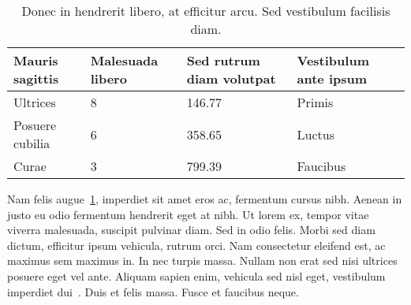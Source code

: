 \begin{center}
	\begin{table}[h]
		\caption{Donec in hendrerit libero, at efficitur arcu. Sed vestibulum facilisis diam.}
		\label{goodCatOrNot}
		\centering
		\begin{tabular}{|l|l|l|l|}
			\hline
			Mauris sagittis &  Malesuada libero & Sed rutrum diam volutpat & Vestibulum ante ipsum \\
			\hline
			Ultrices	&  8 & 146.77 & Primis\\ 
			\hline
			Posuere cubilia	& 6 & 358.65 & Luctus \\ 
			\hline
			Curae	&  3 & 799.39 & Faucibus \\ 
			\hline
		\end{tabular}
	\end{table}
\end{center}

Nam felis augue~\ref*{goodCatOrNot}, imperdiet sit amet eros ac, fermentum cursus nibh. Aenean in justo eu odio fermentum hendrerit eget at nibh. Ut lorem ex, tempor vitae viverra malesuada, suscipit pulvinar diam. Sed in odio felis. Morbi sed diam dictum, efficitur ipsum vehicula, rutrum orci. Nam consectetur eleifend est, ac maximus sem maximus in. In nec turpis massa. Nullam non erat sed nisi ultrices posuere eget vel ante. Aliquam sapien enim, vehicula sed nisl eget, vestibulum imperdiet dui~\cite{Techreport}. Duis et felis massa. Fusce et faucibus neque. 